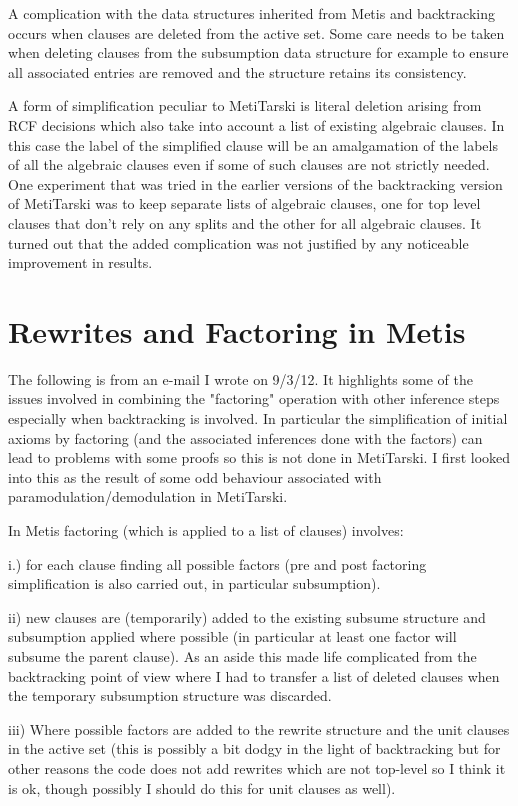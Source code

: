 \documentclass[11pt, oneside]{article}   	%
\begin{document}
A complication with the data structures inherited from Metis and backtracking occurs when clauses are deleted from the active set. Some care needs to be taken when deleting clauses from the subsumption data structure
for example to ensure all associated entries are removed and the structure retains its consistency.

A form of simplification peculiar to MetiTarski is literal deletion arising from RCF decisions which also take into account a list of existing algebraic clauses. In this case the label of the
simplified clause will be an amalgamation of the labels of all the algebraic clauses even if some of such clauses are not strictly needed. One experiment that was tried in the earlier
versions of the backtracking version of MetiTarski was to keep separate lists of algebraic clauses, one for top level clauses that don't rely on any splits and the other for all algebraic clauses.
It turned out that the added complication was not justified by any noticeable improvement in results.

\section{Rewrites and Factoring in Metis}

The following is from an e-mail I wrote on 9/3/12. It highlights some of the issues involved in combining the "factoring" operation with other inference steps especially when backtracking is involved.
In particular the simplification of initial axioms by factoring (and the associated inferences done with the factors) can lead to problems with some proofs so this is not done
in MetiTarski. I first looked into this as the result of some odd behaviour associated with paramodulation/demodulation in MetiTarski.


In Metis factoring (which is applied to a list of clauses) involves:

i.) for each clause finding all possible factors (pre and post factoring simplification is also carried out, in particular subsumption).

ii) new clauses are (temporarily) added to the existing subsume structure and subsumption applied where possible (in particular at least one factor will subsume the parent clause). As an aside this made life complicated from the backtracking point of view where I had to transfer a list of deleted clauses when the temporary subsumption structure was discarded.

iii) Where possible factors are added to the rewrite structure and the unit clauses in the active set (this is possibly a bit dodgy in the light of backtracking but for other reasons the code does not add rewrites which are not top-level so I think it is ok, though possibly I should do this for unit clauses as well).
\end{document}
